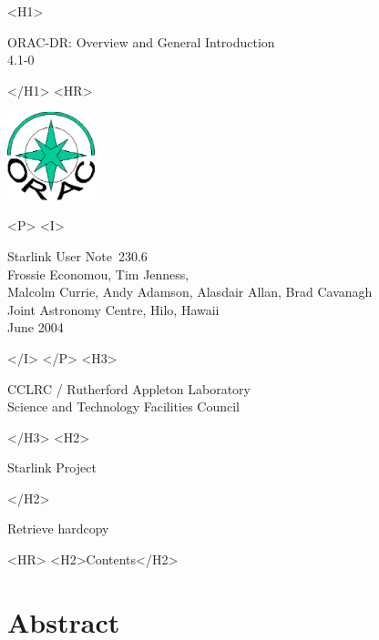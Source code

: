 \documentclass[twoside,11pt]{article}
\newcommand{\stardoccategory}  {Starlink User Note}
\newcommand{\stardocsource}    {sun\stardocnumber}
\newcommand{\stardocnumber}    {230.6}
\newcommand{\stardocauthors}   {Frossie Economou, Tim Jenness,\\
Malcolm Currie, Andy Adamson, Alasdair Allan, Brad Cavanagh\\
Joint Astronomy Centre, Hilo, Hawaii}
\newcommand{\stardocdate}      {June 2004}
\newcommand{\stardoctitle}     {ORAC-DR: Overview and General Introduction}
\newcommand{\stardocversion}   {4.1-0}
\newcommand{\stardocmanual}    {}
\newcommand{\htmladdnormallink}[2]{#1}
\newcommand{\htmladdimg}[1]{}
\newcommand{\htmlref}[2]{#1}
\newcommand{\htmladdtonavigation}[1]{}
\newcommand{\xlabel}[1]{}
\renewcommand{\_}{\texttt{\symbol{95}}}
\begin{document}
\begin{htmlonly}
   \xlabel{}
   \begin{rawhtml} <H1> \end{rawhtml}
      \stardoctitle\\
      \stardocversion\\
      \stardocmanual
   \begin{rawhtml} </H1> <HR> \end{rawhtml}

\includegraphics[width=1.0in]{sun230_logo.eps}

   \begin{rawhtml} <P> <I> \end{rawhtml}
   \stardoccategory\ \stardocnumber \\
   \stardocauthors \\
   \stardocdate
   \begin{rawhtml} </I> </P> <H3> \end{rawhtml}
      \htmladdnormallink{CCLRC / Rutherford Appleton Laboratory}
                        {http://www.cclrc.ac.uk} \\
      \htmladdnormallink{Science and Technology Facilities Council}
                        {http://www.stfc.ac.uk} \\
   \begin{rawhtml} </H3> <H2> \end{rawhtml}
      \htmladdnormallink{Starlink Project}{http://www.starlink.ac.uk/}
   \begin{rawhtml} </H2> \end{rawhtml}
   \htmladdnormallink{\htmladdimg{source.gif} Retrieve hardcopy}
      {http://www.starlink.ac.uk/cgi-bin/hcserver?\stardocsource}\\

  \label{stardoccontents}
  \begin{rawhtml}
    <HR>
    <H2>Contents</H2>
  \end{rawhtml}
  \htmladdtonavigation{\htmlref{\htmladdimg{contents_motif.gif}}
        {stardoccontents}}

  \section{\xlabel{abstract}Abstract}
\end{htmlonly}
\end{document}
